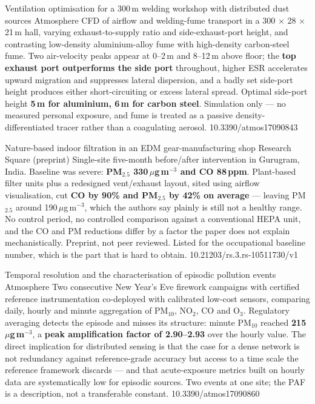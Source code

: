 \documentclass[10pt]{article}
\begin{document}

{Ventilation optimisation for a 300\,m welding workshop with distributed dust sources}
{Atmosphere}
{CFD of airflow and welding-fume transport in a 300 $\times$ 28 $\times$ 21\,m hall,
varying exhaust-to-supply ratio and side-exhaust-port height, and contrasting low-density
aluminium-alloy fume with high-density carbon-steel fume. Two air-velocity peaks appear
at 0--2\,m and 8--12\,m above floor; the \textbf{top exhaust port outperforms the side
port} throughout, higher ESR accelerates upward migration and suppresses lateral
dispersion, and a badly set side-port height produces either short-circuiting or excess
lateral spread. Optimal side-port height \textbf{5\,m for aluminium, 6\,m for carbon
steel}. Simulation only --- no measured personal exposure, and fume is treated as a
passive density-differentiated tracer rather than a coagulating aerosol.}
{10.3390/atmos17090843}

{Nature-based indoor filtration in an EDM gear-manufacturing shop}
{Research Square (preprint)}
{Single-site five-month before/after intervention in Gurugram, India. Baseline was
severe: \textbf{PM$_{2.5}$ 330\,$\mu$g\,m$^{-3}$ and CO 88\,ppm}. Plant-based filter
units plus a redesigned vent/exhaust layout, sited using airflow visualisation, cut
\textbf{CO by 90\% and PM$_{2.5}$ by 42\% on average} --- leaving PM$_{2.5}$ around
190\,$\mu$g\,m$^{-3}$, which the authors say plainly is still not a healthy range. No
control period, no controlled comparison against a conventional HEPA unit, and the CO
and PM reductions differ by a factor the paper does not explain mechanistically.
Preprint, not peer reviewed. Listed for the occupational baseline number, which is the
part that is hard to obtain.}
{10.21203/rs.3.rs-10511730/v1}


{Temporal resolution and the characterisation of episodic pollution events}
{Atmosphere}
{Two consecutive New Year's Eve firework campaigns with certified reference
instrumentation co-deployed with calibrated low-cost sensors, comparing daily, hourly and
minute aggregation of PM$_{10}$, NO$_2$, CO and O$_3$. Regulatory averaging detects the
episode and misses its structure: minute PM$_{10}$ reached \textbf{215\,$\mu$g\,m$^{-3}$},
a \textbf{peak amplification factor of 2.90--2.93} over the hourly value. The direct
implication for distributed sensing is that the case for a dense network is not
redundancy against reference-grade accuracy but access to a time scale the reference
framework discards --- and that acute-exposure metrics built on hourly data are
systematically low for episodic sources. Two events at one site; the PAF is a description,
not a transferable constant.}
{10.3390/atmos17090860}
\end{document}
